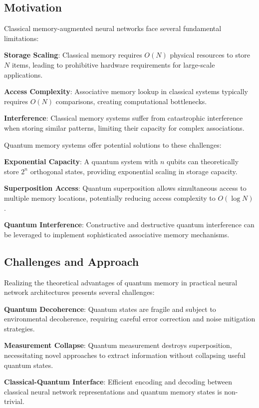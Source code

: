 \subsection{Motivation}

Classical memory-augmented neural networks face several fundamental limitations:

\textbf{Storage Scaling}: Classical memory requires $O(N)$ physical resources to store $N$ items, leading to prohibitive hardware requirements for large-scale applications.

\textbf{Access Complexity}: Associative memory lookup in classical systems typically requires $O(N)$ comparisons, creating computational bottlenecks.

\textbf{Interference}: Classical memory systems suffer from catastrophic interference when storing similar patterns, limiting their capacity for complex associations.

Quantum memory systems offer potential solutions to these challenges:

\textbf{Exponential Capacity}: A quantum system with $n$ qubits can theoretically store $2^n$ orthogonal states, providing exponential scaling in storage capacity.

\textbf{Superposition Access}: Quantum superposition allows simultaneous access to multiple memory locations, potentially reducing access complexity to $O(\log N)$.

\textbf{Quantum Interference}: Constructive and destructive quantum interference can be leveraged to implement sophisticated associative memory mechanisms.

\subsection{Challenges and Approach}

Realizing the theoretical advantages of quantum memory in practical neural network architectures presents several challenges:

\textbf{Quantum Decoherence}: Quantum states are fragile and subject to environmental decoherence, requiring careful error correction and noise mitigation strategies.

\textbf{Measurement Collapse}: Quantum measurement destroys superposition, necessitating novel approaches to extract information without collapsing useful quantum states.

\textbf{Classical-Quantum Interface}: Efficient encoding and decoding between classical neural network representations and quantum memory states is non-trivial.

